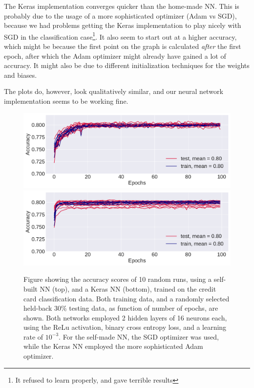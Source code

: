 \documentclass[10pt, twocolumn]{article}
\begin{document}
The Keras implementation converges quicker than the home-made NN. This is probably due to the usage of a more sophisticated optimizer (Adam vs SGD), because we had problems getting the Keras implementation to play nicely with SGD in the classification case\footnote{It refused to learn properly, and gave terrible results}. It also seem to start out at a higher accuracy, which might be because the first point on the graph is calculated \textit{after} the first epoch, after which the Adam optimizer might already have gained a lot of accuracy. It might also be due to different initialization techniques for the weights and biases.

The plots do, however, look qualitatively similar, and our neural network implementation seems to be working fine.


\begin{figure}[h]
    \centering
    \includegraphics[scale=0.4]{../figs/cc_epochs_self.pdf}
    \includegraphics[scale=0.4]{../figs/CC_epochs_TF.pdf}
    \caption{Figure showing the accuracy scores of 10 random runs, using a self-built NN (top), and a Keras NN (bottom), trained on the credit card classification data. Both training data, and a randomly selected held-back 30\% testing data, as function of number of epochs, are shown. Both networks employed 2 hidden layers of 16 neurons each, using the ReLu activation, binary cross entropy loss, and a learning rate of $10^{-3}$. For the self-made NN, the SGD optimizer was used, while the Keras NN employed the more sophisticated Adam optimizer.}
    \label{fig:CC_epochs}
\end{figure}
\end{document}
